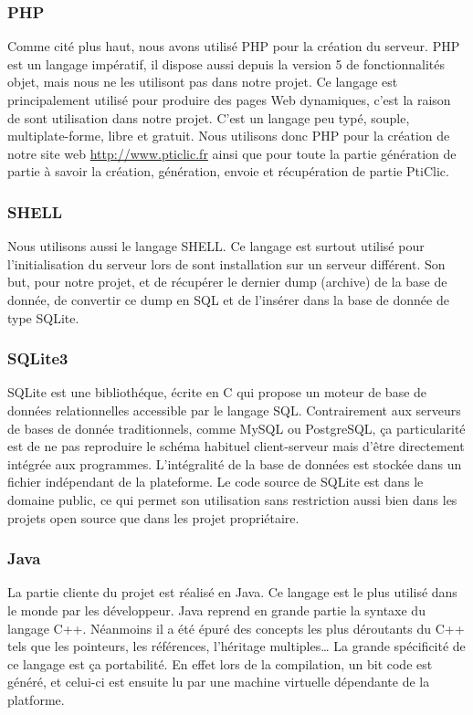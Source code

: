\documentclass[a4paper,11pt,french]{article}
\begin{document}
\subsubsection{PHP}
Comme cité plus haut, nous avons utilisé PHP pour la création du serveur. PHP est un langage impératif, il dispose aussi depuis la version 5 de fonctionnalités objet, mais nous ne les utilisont pas dans notre projet. Ce langage est
principalement utilisé pour produire des pages Web dynamiques, c'est la raison de sont utilisation dans notre projet. C'est un langage peu typé, souple, multiplate-forme, libre et gratuit.
Nous utilisons donc PHP pour la création de notre site web \url{http://www.pticlic.fr} ainsi que pour toute la partie génération de partie à savoir la création, génération, envoie et récupération de partie PtiClic.

\subsubsection{SHELL}
Nous utilisons aussi le langage SHELL. Ce langage est surtout utilisé pour l'initialisation du serveur lors de sont installation sur un serveur différent. Son but, pour notre projet, et de récupérer le dernier dump (archive) de la base de donnée, de convertir ce dump en SQL et de l'insérer dans la base de donnée de type SQLite.

\subsubsection{SQLite3}
SQLite est une bibliothéque, écrite en C qui propose un moteur de base de données relationnelles accessible par le langage SQL. Contrairement aux serveurs de bases de donnée traditionnels, comme MySQL ou PostgreSQL, ça particularité est de ne pas reproduire le schéma habituel client-serveur mais d'être directement intégrée aux programmes. L'intégralité de la base de données est stockée dans un fichier indépendant de la plateforme. Le code source de SQLite est dans le domaine public, ce qui permet son utilisation sans restriction aussi bien dans les projets open source que dans les projet propriétaire.

\subsubsection{Java}
La partie cliente du projet est réalisé en Java. Ce langage est le plus utilisé dans le monde par les développeur. Java reprend en grande partie la syntaxe du langage C++. Néanmoins il a été épuré des concepts les plus déroutants du C++ tels que les pointeurs, les références, l'héritage multiples\dots{} La grande spécificité de ce langage est ça portabilité. En effet lors de la compilation, un bit code est généré, et celui-ci est ensuite lu par une machine virtuelle dépendante de la platforme.
\end{document}
